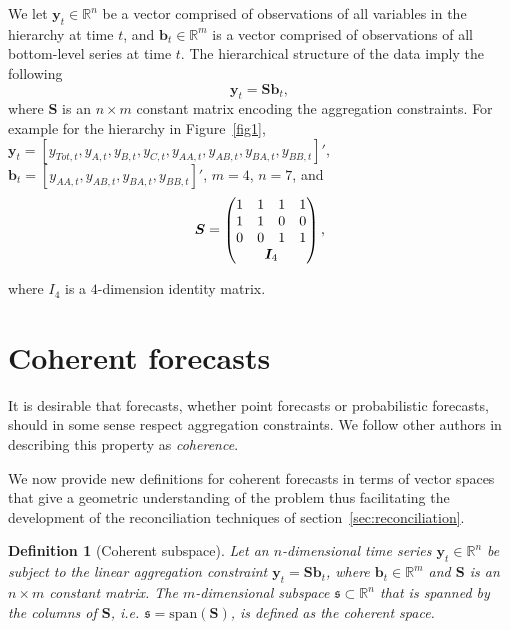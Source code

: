 \documentclass[a4paper, 11pt]{article}
\newtheorem{definition}{Definition}[section]
\begin{document}
We let $\bm{y}_t \in \mathbb{R}^n$ be a vector comprised of observations of all variables in the hierarchy at time $t$,  and $\bm{b}_t \in \mathbb{R}^m$ is a vector comprised of observations of all bottom-level series at time $t$. The hierarchical structure of the data imply the following
\begin{equation}
  \bm{y}_t = \bm{Sb}_t,
\end{equation}
where $\bm{S}$ is an $n \times m$ constant matrix encoding the aggregation constraints.  For example for the hierarchy in Figure~\ref{fig1}, $\bm{y}_t = [y_{Tot,t},y_{A,t}, y_{B,t},y_{C,t},y_{AA,t}, y_{AB,t}, y_{BA,t}, y_{BB,t}]'$, $\bm{b}_t = [y_{AA,t}, y_{AB,t}, y_{BA,t}, y_{BB,t}]'$, $m=4$, $n=7$, and 
$$ 
  \bm{S} = \begin{pmatrix} 
               1& 1 &1 &1  \\ 
               1 &1 & 0 &0 \\   
               0&0  & 1 & 1 \\ 
               & \multicolumn{2}{c}{\bm{I}_4} &   
           \end{pmatrix}, 
$$ 

where $I_4$ is a $4$-dimension identity matrix.  


\section{Coherent forecasts}\label{sec:definitions}

It is desirable that forecasts, whether point forecasts or probabilistic forecasts, should in some sense respect aggregation constraints.  We follow other authors in describing this property as {\em coherence}.   

We now provide new definitions for coherent forecasts in terms of vector spaces that give a geometric understanding of the problem thus facilitating the development of the reconciliation techniques of section~\ref{sec:reconciliation}. 

\begin{definition}[Coherent subspace]
Let an $n$-dimensional time series $\bm{y}_t \in \mathbb{R}^n$ be subject to the linear aggregation constraint $\bm{y}_t = \bm{S}\bm{b}_t$, where $\bm{b}_t \in \mathbb{R}^m$ and $\bm{S}$ is an $n \times m$ constant matrix. The $m$-dimensional subspace $\mathfrak{s}\subset \mathbb{R}^n$ that is spanned by the columns of $\bm{S}$, i.e. $\mathfrak{s}=\mbox{span}(\bm{S})$, is defined as the {\em coherent space}. 
\end{definition}
\end{document}
